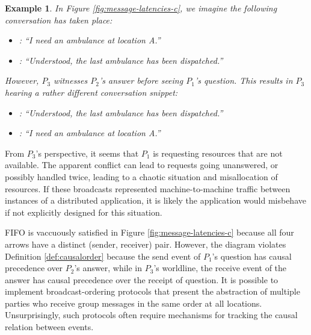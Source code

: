 \documentclass[]             %
{NASA}                       %
\newtheorem{example}{Example}
\theoremstyle{definition}
\begin{document}
\begin{example}
  \label{exmpl:ambulancedispatch}
  In Figure \ref{fig:message-latencies-c}, we imagine the following
  conversation has taken place:
\begin{itemize}
\item [$P_1$]: ``I need an ambulance at location A.''
\item [$P_2$]: ``Understood, the last ambulance has been dispatched.''
\end{itemize}
However, $P_3$ witnesses $P_2$'s answer before seeing $P_1$'s
question. This results in $P_3$ hearing a rather different conversation snippet:
\begin{itemize}
\item [$P_2$]: ``Understood, the last ambulance has been dispatched.''
\item [$P_1$]: ``I need an ambulance at location A.''
\end{itemize}
\end{example}
From $P_3$'s perspective, it seems that $P_1$ is requesting resources
that are not available. The apparent conflict can lead to requests
going unanswered, or possibly handled twice, leading to a chaotic
situation and misallocation of resources. If these broadcasts
represented machine-to-machine traffic between instances of a
distributed application, it is likely the application would misbehave
if not explicitly designed for this situation.

FIFO is vaccuously satisfied in Figure \ref{fig:message-latencies-c}
because all four arrows have a distinct (sender, receiver)
pair. However, the diagram violates Definition \ref{def:causalorder}
because the send event of $P_1$'s question has causal precedence over
$P_2$'s answer, while in $P_3$'s worldline, the receive event of the
answer has causal precedence over the receipt of question. It is
possible to implement broadcast-ordering protocols that present the
abstraction of multiple parties who receive group messages in the same
order at all locations. Unsurprisingly, such protocols often require
mechanisms for tracking the causal relation between events.
\end{document}
